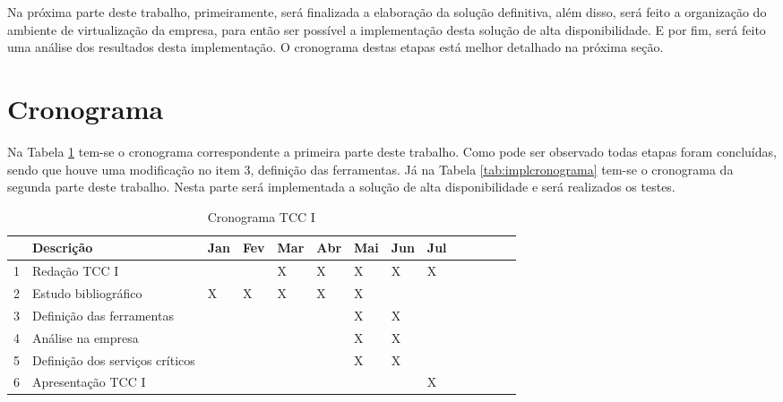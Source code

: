 Na próxima parte deste trabalho, primeiramente, será finalizada a elaboração da solução definitiva, além disso, será feito a organização do 
ambiente de virtualização da empresa, para então ser possível a implementação desta solução de alta disponibilidade. E por fim, será feito uma 
análise dos resultados desta implementação. O cronograma destas etapas está melhor detalhado na próxima seção.



\section{Cronograma}
\label{section:cronograma}

Na Tabela \ref{tab:propcronograma} tem-se o cronograma correspondente a primeira parte deste trabalho. Como pode ser observado todas etapas foram
concluídas, sendo que houve uma modificação no item 3, definição das ferramentas.
Já na Tabela \ref{tab:implcronograma} tem-se o cronograma da segunda parte deste trabalho. Nesta parte será implementada a solução de 
alta disponibilidade e será realizados os testes.

\begin{table}[h!]\normalsize %
\caption {Cronograma TCC I}
\label{tab:propcronograma}
\begin{center}
\def\arraystretch{1}
\setlength{\tabcolsep}{0.15cm}
\begin{tabular}{|l|l|l|l|l|l|l|l|l|l|l|l|l|l|}\hline
 & \textbf{Descrição} & \textbf{Jan} & \textbf{Fev} & \textbf{Mar} & \textbf{Abr} & \textbf{Mai} & \textbf{Jun} & \textbf{Jul} \\\hline
1 & Redação TCC I & & & X & X & X & X & X \\\hline
2 & Estudo bibliográfico & X & X & X & X & X & & \\\hline
3 & Definição das ferramentas & & & & & X & X & \\\hline
4 & Análise na empresa & & & & & X & X & \\\hline
5 & Definição dos serviços críticos & & & & & X & X & \\\hline
6 & Apresentação TCC I & & & & & & & X \\\hline
\end{tabular}
\end{center}
\end{table}

